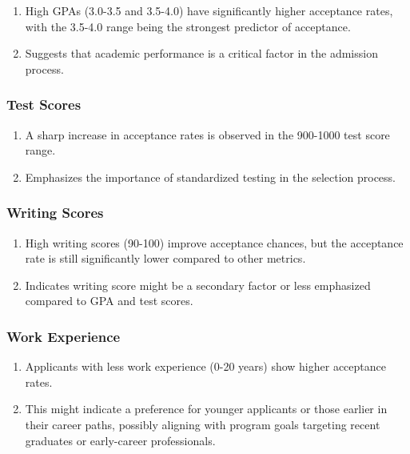 \documentclass[
  letterpaper,
  DIV=11,
  numbers=noendperiod]{scrartcl}
\providecommand{\tightlist}{%
  \setlength{\itemsep}{0pt}\setlength{\parskip}{0pt}}\usepackage{longtable,booktabs,array}
\begin{document}
\begin{enumerate}
\def\labelenumi{\arabic{enumi}.}
\tightlist
\item
  High GPAs (3.0-3.5 and 3.5-4.0) have significantly higher acceptance
  rates, with the 3.5-4.0 range being the strongest predictor of
  acceptance.
\item
  Suggests that academic performance is a critical factor in the
  admission process.
\end{enumerate}

\subsubsection{Test Scores}\label{test-scores}

\begin{enumerate}
\def\labelenumi{\arabic{enumi}.}
\tightlist
\item
  A sharp increase in acceptance rates is observed in the 900-1000 test
  score range.
\item
  Emphasizes the importance of standardized testing in the selection
  process.
\end{enumerate}

\subsubsection{Writing Scores}\label{writing-scores}

\begin{enumerate}
\def\labelenumi{\arabic{enumi}.}
\tightlist
\item
  High writing scores (90-100) improve acceptance chances, but the
  acceptance rate is still significantly lower compared to other
  metrics.
\item
  Indicates writing score might be a secondary factor or less emphasized
  compared to GPA and test scores.
\end{enumerate}

\subsubsection{Work Experience}\label{work-experience}

\begin{enumerate}
\def\labelenumi{\arabic{enumi}.}
\tightlist
\item
  Applicants with less work experience (0-20 years) show higher
  acceptance rates.
\item
  This might indicate a preference for younger applicants or those
  earlier in their career paths, possibly aligning with program goals
  targeting recent graduates or early-career professionals.
\end{enumerate}
\end{document}
